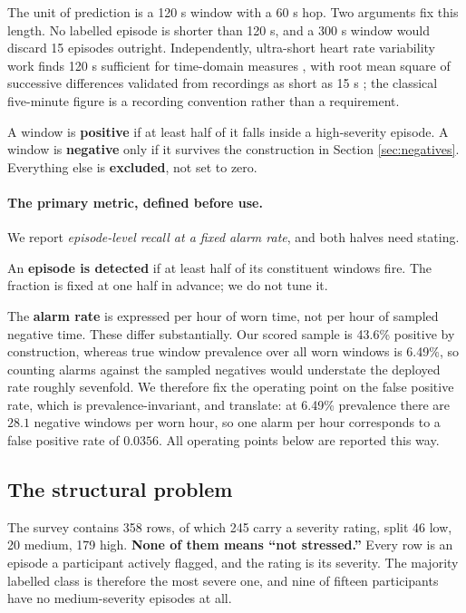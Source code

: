 \documentclass{article}
\begin{document}
The unit of prediction is a 120 s window with a 60 s
hop. Two arguments fix this length. No labelled episode is shorter than
120 s, and a 300 s window would discard 15 episodes
outright. Independently, ultra-short heart rate variability work finds
120 s sufficient for time-domain measures \cite{munoz2015}, with
root mean square of successive differences validated from recordings as short
as 15 s \cite{orini2023}; the classical five-minute figure is a
recording convention rather than a requirement.

A window is \textbf{positive} if at least half of it falls inside a
high-severity episode. A window is \textbf{negative} only if it survives the
construction in Section \ref{sec:negatives}. Everything else is
\textbf{excluded}, not set to zero.

\paragraph{The primary metric, defined before use.} We report
\emph{episode-level recall at a fixed alarm rate}, and both halves need
stating.

An \textbf{episode is detected} if at least half of its constituent windows
fire. The fraction is fixed at one half in advance; we do not tune it.

The \textbf{alarm rate} is expressed per hour of worn time, not per hour of
sampled negative time. These differ substantially. Our scored sample is
43.6\% positive by construction, whereas true window prevalence
over all worn windows is 6.49\%, so counting alarms against the
sampled negatives would understate the deployed rate roughly sevenfold. We
therefore fix the operating point on the false positive rate, which is
prevalence-invariant, and translate: at 6.49\% prevalence there
are $28.1$ negative windows per worn hour, so one alarm per hour corresponds to
a false positive rate of $0.0356$. All operating points below are reported this
way.

\subsection{The structural problem}

The survey contains 358 rows, of which 245 carry a severity rating, split 46
low, 20 medium, 179 high. \textbf{None of them means ``not stressed.''} Every
row is an episode a participant actively flagged, and the rating is its
severity. The majority labelled class is therefore the most severe one, and
nine of fifteen participants have no medium-severity episodes at all.
\end{document}
